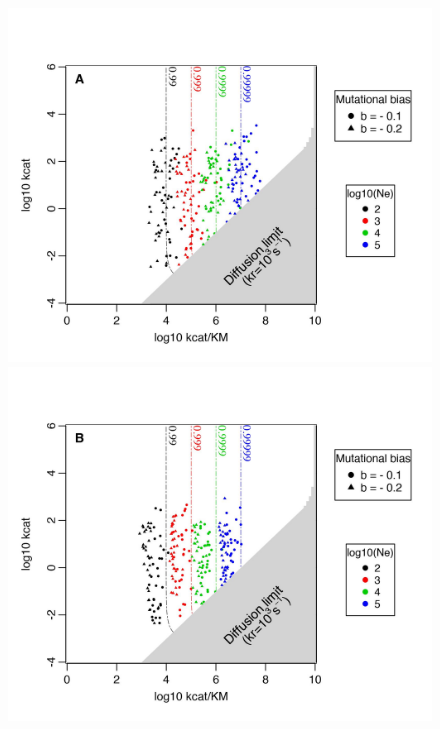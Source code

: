 \begin{figure}[!p]
\begin{center}
\begin{minipage}[c]{0.6\linewidth}
\includegraphics[scale=0.675,trim=0cm 0cm 0cm 0cm,clip]{pics/SM-Enzymes/2DFitLandscape_Evo_Results_lowF_withbias_MutCorr.jpeg} 
\vspace{0.2cm}
\includegraphics[scale=0.675,trim=0cm 0cm 0cm 0cm,clip]{pics/SM-Enzymes/2DFitLandscape_Evo_Results_lowF_withbias_HighMutCorr.jpeg}

\end{minipage}
\end{center}
\end{figure}
